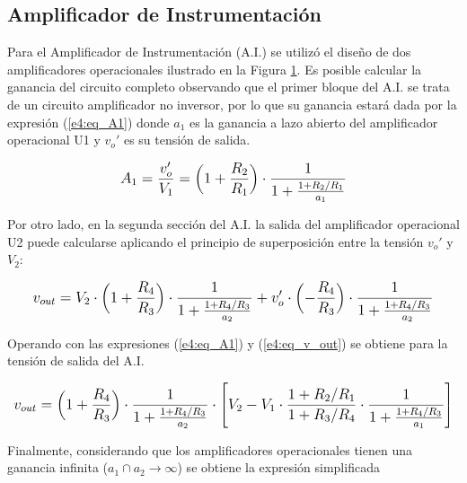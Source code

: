 \subsection{Amplificador de Instrumentación}
Para el Amplificador de Instrumentación (A.I.) se utilizó el diseño de dos amplificadores operacionales ilustrado en la Figura \ref{e4:fig_amp_inst}.
Es posible calcular la ganancia del circuito completo observando que el primer bloque del A.I. se trata de un circuito amplificador no inversor, por lo que su ganancia estará dada por la expresión (\ref{e4:eq_A1}) donde $a_1$ es la ganancia a lazo abierto del amplificador operacional U1 y $v_o'$ es su tensión de salida.

\begin{figure}[ht]
\begin{center}

\label{e4:fig_amp_inst}
\end{center}
\end{figure}

\begin{equation}
\mathlarger{
A_1 = \frac{v_o'}{V_1} = \left(1+ \frac{R_2}{R_1}\right) \cdot \frac{1}{1 + \frac{1+R_2/R_1}{a_1}}
}
\label{e4:eq_A1}
\end{equation}

Por otro lado, en la segunda sección del A.I. la salida del amplificador operacional U2 puede calcularse aplicando el principio de superposición entre la tensión $v_o'$ y $V_2$:

\begin{equation}
\mathlarger{
v_{out} = V_2 \cdot \left(1 + \frac{R_4}{R_3}\right) \cdot \frac{1}{1 + \frac{1+R_4/R_3}{a_2}} + v_o' \cdot \left(- \frac{R_4}{R_3}\right) \cdot \frac{1}{1 + \frac{1+R_4/R_3}{a_2}}
}
\label{e4:eq_v_out}
\end{equation}

Operando con las expresiones (\ref{e4:eq_A1}) y (\ref{e4:eq_v_out}) se obtiene para la tensión de salida del A.I.

\begin{equation}
\mathlarger{
v_{out} = \left(1 + \frac{R_4}{R_3}\right) \cdot \frac{1}{1 + \frac{1+R_4/R_3}{a_2}} \cdot \left[ V_2 - V_1 \cdot \frac{1+ R_2/R_1}{1+R_3/R_4} \cdot \frac{1}{1 + \frac{1+R_4/R_3}{a_1}} \right]
}
\label{e4:eq_v_out_a_fin}
\end{equation}

Finalmente, considerando que los amplificadores operacionales tienen una ganancia infinita ($a_1 \cap a_2 \rightarrow \infty$) se obtiene la expresión simplificada 

